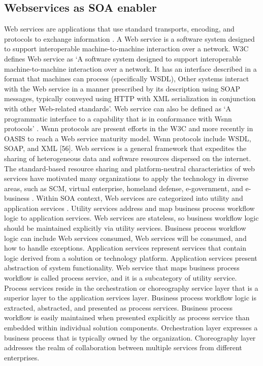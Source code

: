 \documentclass[12pt,a4paper,final,twoside,onecolumn,titlepage]{book}
\begin{document}
\subsection{Webservices as SOA enabler}
Web services are applications that use standard transports, encoding, and protocols to exchange information \cite{R52}. A Web service is a software system designed to support interoperable machine-to-machine interaction over a network. \gls{W3C} defines Web service as ‘A software system designed to support interoperable machine-to-machine interaction over a network. It has an interface described in a format that machines can process (specifically \gls{WSDL}), Other systems interact with the Web service in a manner prescribed by its description using \gls{SOAP} messages, typically conveyed using \gls{HTTP} with \gls{XML} serialization in conjunction with other Web-related standards’. Web service can also be defined as ‘A programmatic interface to a capability that is in conformance with Wsnn protocols’ \cite{BS28}. Wsnn protocols are present efforts in the \gls{W3C} and more recently in OASIS to reach a Web service maturity model. Wsnn protocols include \gls{WSDL}, \gls{SOAP}, and \gls{XML} [56]. Web services is a general framework that expedites the sharing of heterogeneous data and software resources dispersed on the internet. The standard-based resource sharing and platform-neutral characteristics of web services have motivated many organizations to apply the technology in diverse areas, such as \gls{SCM}, virtual enterprise, homeland defense, e-government, and e-business \cite{R57}. 
Within \gls{SOA} context, Web services are categorized into utility and application services \cite{BS58}. Utility services address and map business process workflow logic to application services. Web services are stateless, so business workflow logic should be maintained explicitly via utility services. Business process workflow logic can include Web services consumed, Web services will be consumed, and how to handle exceptions. Application services represent services that contain logic derived from a solution or technology platform. Application services present abstraction of system functionality.
Web service that maps business process workflow is called process service, and it is a subcategory of utility service. Process services reside in the orchestration or choreography service layer that is a superior layer to the application services layer. Business process workflow logic is extracted, abstracted, and presented as process services. Business process workflow is easily maintained when presented explicitly as process service than embedded within individual solution components. Orchestration layer expresses a business process that is typically owned by the organization. Choreography layer addresses the realm of collaboration between multiple services from different enterprises.
\end{document}
